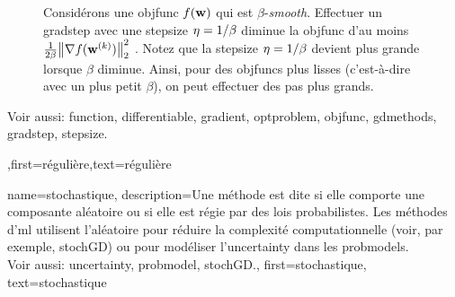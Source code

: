 {{\begin{figure}[H]
\begin{center}
			\end{center}
			\caption{Considérons une \gls{objfunc} $f({\bf w})$ qui est $\beta$-\textit{smooth}. 
				Effectuer un \gls{gradstep} avec une \gls{stepsize} $\eta = 1/\beta$ diminue la 
				\gls{objfunc} d’au moins $\frac{1}{2\beta}\normgeneric{\nabla f(\weights^{(\iteridx)})}{2}^{2}$ \cite{nesterov04,CvxAlgBertsekas,CvxBubeck2015}. 
				Notez que la \gls{stepsize} $\eta = 1/\beta$ devient plus grande lorsque $\beta$ diminue. Ainsi, 
				pour des \glspl{objfunc} plus lisses (c’est-à-dire avec un plus petit $\beta$), 
				on peut effectuer des pas plus grands. \label{fig_gd_smooth_dict}}
		\end{figure}
	Voir aussi: \gls{function}, \gls{differentiable}, \gls{gradient}, \gls{optproblem}, \gls{objfunc}, \gls{gdmethods}, \gls{gradstep}, \gls{stepsize}.
	},first={régulière},text={régulière}}


{name={stochastique},
	description={Une méthode est dite  si elle comporte une composante aléatoire 
		ou si elle est régie par des lois probabilistes. Les méthodes d'\gls{ml} utilisent l'aléatoire 
		pour réduire la complexité computationnelle (voir, par exemple, \gls{stochGD}) ou pour modéliser 
		l'\gls{uncertainty} dans les \glspl{probmodel}. \\
		Voir aussi: \gls{uncertainty}, \gls{probmodel}, \gls{stochGD}.},
	first={stochastique},
	text={stochastique}
}

